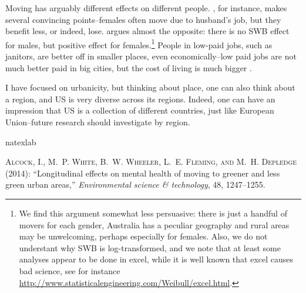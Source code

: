 \documentclass[10pt, letterpaper]{article}
\begin{document}
\begin{spacing}{2.0}
Moving has arguably different effects on different people.
\citet{schoenbaum17}, for instance, makes several convincing points--females
often move due to husband's job, but they benefit less, or indeed,
lose. \citet{kettlewell10} argues almost the opposite: there is no SWB effect
for males, but positive effect for females.\footnote{We find this argument
  somewhat less
  persuasive: there is just a handful of movers for each
gender, Australia has a peculiar geography and rural areas may be unwelcoming,
perhaps especially for females. Also, we do not understant why SWB is
log-transformed, and we note that at least some analyses appear to
be done in excel, while it is well known that excel causes bad science, see for
instance \url{http://www.statisticalengineering.com/Weibull/excel.html}. }
People in low-paid jobs, such as janitors, are better off in smaller
places, even economically--low paid jobs are not much better paid in big cities,
but the cost of living is much bigger \citep{schoenbaum17, irwinNYT17sep3}. 

I have focused on urbanicity, but thinking about place, one can also think about
a region, and US is very diverse across its regions. Indeed, one can have an
impression that US is a collection of different countries, just like European
Union--future research should investigate by region.




% 

\newpage
%
\begin{thebibliography}{115}
\newcommand{\enquote}[1]{``#1''}
\expandafter\ifx\csname natexlab\endcsname\relax\def\natexlab#1{#1}\fi

\textsc{Alcock, I., M.~P. White, B.~W. Wheeler, L.~E. Fleming, and M.~H.
  Depledge} (2014): \enquote{Longitudinal effects on mental health of moving to
  greener and less green urban areas,} \emph{Environmental science \&
  technology}, 48, 1247--1255.


\end{thebibliography}
\end{spacing}
\end{document}

